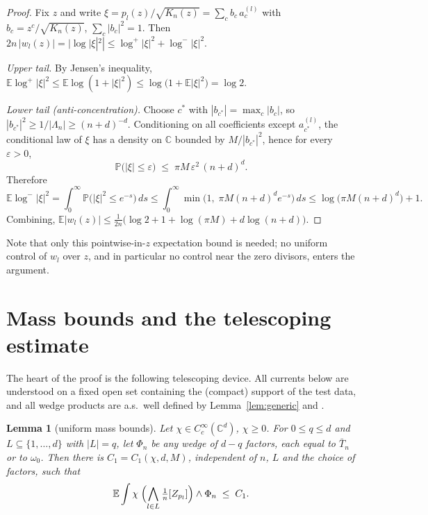 \documentclass[12pt]{article}
\def\C{\mathbb{C}}
\def\E{\mathbb{E}}
\def\P{\mathbb{P}}
\newtheorem{lemma}{Lemma}[section]
\begin{document}
\begin{proof}
Fix $z$ and write $\xi = p_l(z)/\sqrt{K_n(z)} = \sum_{c} b_c\, a^{(l)}_c$ with
$b_c = z^c / \sqrt{K_n(z)}$, $\sum_c |b_c|^2 = 1$. Then
$2n\,|w_l(z)| = |\log |\xi|^2| \le \log^+ |\xi|^2 + \log^- |\xi|^2$.

\emph{Upper tail.} By Jensen's inequality,
$\E \log^+ |\xi|^2 \le \E \log (1 + |\xi|^2) \le \log\bigl(1 + \E|\xi|^2\bigr) = \log 2$.

\emph{Lower tail (anti-concentration).} Choose $c^*$ with $|b_{c^*}| = \max_c |b_c|$, so
$|b_{c^*}|^2 \ge 1/|\Lambda_n| \ge (n+d)^{-d}$. Conditioning on all coefficients except
$a^{(l)}_{c^*}$, the conditional law of $\xi$ has a density on $\C$ bounded by
$M/|b_{c^*}|^2$, hence for every $\varepsilon > 0$,
\[
  \P\bigl( |\xi| \le \varepsilon \bigr) \;\le\; \pi M\, \varepsilon^2\, (n+d)^d .
\]
Therefore
\[
  \E \log^- |\xi|^2
  = \int_0^\infty \P\bigl(|\xi|^2 \le e^{-s}\bigr)\, ds
  \le \int_0^\infty \min\bigl( 1,\; \pi M (n+d)^d e^{-s} \bigr)\, ds
  \le \log\bigl(\pi M (n+d)^d\bigr) + 1 .
\]
Combining, $\E|w_l(z)| \le \frac{1}{2n}\bigl( \log 2 + 1 + \log(\pi M) + d\log(n+d)
\bigr)$.
\end{proof}

Note that only this pointwise-in-$z$ expectation bound is needed; no uniform control of
$w_l$ over $z$, and in particular no control near the zero divisors, enters the
argument.

\section{Mass bounds and the telescoping estimate}

The heart of the proof is the following telescoping device. All currents below are
understood on a fixed open set containing the (compact) support of the test data, and
all wedge products are a.s.\ well defined by Lemma~\ref{lem:generic} and
\cite[Ch.~III]{Dem}.

\begin{lemma}[uniform mass bounds]\label{lem:mass}
Let $\chi \in C^\infty_c(\C^d)$, $\chi \ge 0$. For $0 \le q \le d$ and $L \subseteq
\{1,\dots,d\}$ with $|L| = q$, let $\Phi_n$ be any wedge of $d - q$ factors, each equal
to $\bar T_n$ or to $\omega_0$. Then there is $C_1 = C_1(\chi, d, M)$, independent of
$n$, $L$ and the choice of factors, such that
\[
  \E \int \chi\; \Bigl( \bigwedge_{l \in L} \tfrac1n [Z_{p_l}] \Bigr) \wedge \Phi_n
  \;\le\; C_1 .
\]
\end{lemma}
\end{document}
